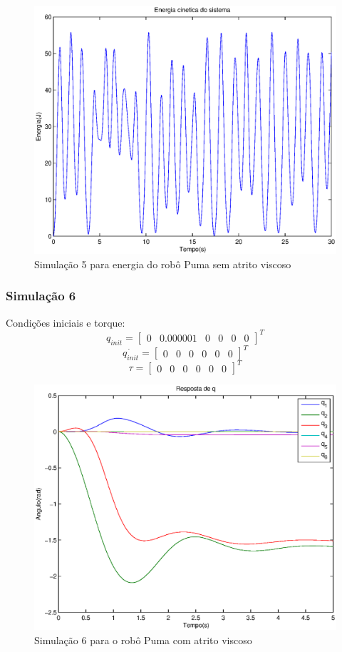 \documentclass{article}
\begin{document}
\begin{figure}[H]
	\centering
	\includegraphics[width=0.8\linewidth]{../longsims/sime1kin.eps}
	\caption{Simulação 5 para energia do robô Puma sem atrito viscoso}
	\label{fig:energysim5nf}
\end{figure}

\subsubsection{Simulação 6}
Condições iniciais e torque:
\begin{equation}
\label{eq:sim6q}
q_{init}=\begin{bmatrix}
0 & 0.000001 & 0 & 0 & 0 & 0
\end{bmatrix}^T
\end{equation}
\begin{equation}
\label{eq:sim6qd}
\dot{q_{init}}=\begin{bmatrix}
0 & 0 & 0 & 0 & 0 & 0
\end{bmatrix}^T
\end{equation}
\begin{equation}
\label{eq:sim6tau}
\tau=\begin{bmatrix}
0 & 0 & 0 & 0 & 0 & 0
\end{bmatrix}^T
\end{equation}

\begin{figure}[H]
	\centering
	\includegraphics[width=0.8\linewidth]{../sime2odea}
	\caption{Simulação 6 para o robô Puma com atrito viscoso}
	\label{fig:pumasim6}
\end{figure}
\end{document}
